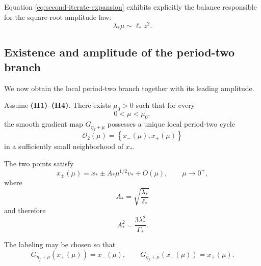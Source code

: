 Equation \eqref{eq:second-iterate-expansion} exhibits explicitly the
balance responsible for the square-root amplitude law:
\[
\lambda_*\mu
\sim
\ell_*z^2.
\]

\subsection{Existence and amplitude of the period-two branch}
\label{subsec:period-two-amplitude}

We now obtain the local period-two branch together with its leading
amplitude.

\begin{theorem}
\label{thm:period-two-branch}
Assume \textbf{(H1)--(H4)}.
There exists $\mu_0>0$ such that for every
\[
0<\mu<\mu_0,
\]
the smooth gradient map $G_{\eta_f+\mu}$ possesses a unique local
period-two cycle
\begin{equation}
\mathcal O_2(\mu)
=
\left\{
x_-(\mu),x_+(\mu)
\right\}
\label{eq:period-two-cycle}
\end{equation}
in a sufficiently small neighborhood of $x_*$.

The two points satisfy
\begin{equation}
x_\pm(\mu)
=
x_*
\pm
A_*\mu^{1/2}v_*
+
O(\mu),
\qquad
\mu\to0^+,
\label{eq:period-two-x-expansion}
\end{equation}
where
\begin{equation}
A_*
=
\sqrt{\frac{\lambda_*}{\ell_*}}
\label{eq:A-star-ell}
\end{equation}
and therefore
\begin{equation}
A_*^2
=
\frac{3\lambda_*^2}{\Gamma_*}.
\label{eq:A-star-Gamma}
\end{equation}

The labeling may be chosen so that
\begin{equation}
G_{\eta_f+\mu}(x_+(\mu))
=
x_-(\mu),
\qquad
G_{\eta_f+\mu}(x_-(\mu))
=
x_+(\mu).
\label{eq:period-two-exchange}
\end{equation}
\end{theorem}

